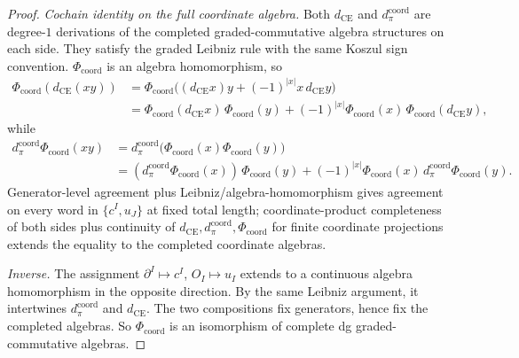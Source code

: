 \documentclass[11pt]{memoir}
\begin{document}
\begin{proof}
  \emph{Cochain identity on the full coordinate algebra.} Both
  \(d_{\mathrm{CE}}\) and \(d_\pi^{\mathrm{coord}}\) are degree-\(1\) derivations of the
  completed graded-commutative algebra structures on each side. They
	  satisfy the graded Leibniz rule with the same Koszul sign
	  convention. \(\Phi_{\mathrm{coord}}\) is an algebra homomorphism, so
	  \begin{align*}
	    \Phi_{\mathrm{coord}}(d_{\mathrm{CE}}(xy))
	    &=
	    \Phi_{\mathrm{coord}}\bigl((d_{\mathrm{CE}}x)y
	      +(-1)^{|x|}x\,d_{\mathrm{CE}}y\bigr)\\
	    &=
	    \Phi_{\mathrm{coord}}(d_{\mathrm{CE}}x)\,
	    \Phi_{\mathrm{coord}}(y)
	    +(-1)^{|x|}\Phi_{\mathrm{coord}}(x)\,
	    \Phi_{\mathrm{coord}}(d_{\mathrm{CE}}y),
	  \end{align*}
	  while
	  \begin{align*}
		    d_\pi^{\mathrm{coord}}\Phi_{\mathrm{coord}}(xy)
	    &=
		    d_\pi^{\mathrm{coord}}\bigl(\Phi_{\mathrm{coord}}(x)
	      \Phi_{\mathrm{coord}}(y)\bigr)\\
	    &=
		    (d_\pi^{\mathrm{coord}}\Phi_{\mathrm{coord}}(x))\,
	    \Phi_{\mathrm{coord}}(y)
	    +(-1)^{|x|}\Phi_{\mathrm{coord}}(x)\,
		    d_\pi^{\mathrm{coord}}\Phi_{\mathrm{coord}}(y).
	  \end{align*}
  Generator-level agreement plus Leibniz/algebra-homomorphism gives
  agreement on every word in $\{c^I,u_J\}$ at fixed total length;
  coordinate-product completeness of both sides plus continuity of
	  \(d_{\mathrm{CE}}, d_\pi^{\mathrm{coord}},\Phi_{\mathrm{coord}}\) for finite coordinate
  projections extends the equality to the completed coordinate algebras.

  \emph{Inverse.} The assignment $\partial^I\mapsto c^I$,
  $O_I\mapsto u_I$ extends to a continuous algebra homomorphism in the
  opposite direction. By the same Leibniz argument, it intertwines
	  \(d_\pi^{\mathrm{coord}}\) and \(d_{\mathrm{CE}}\). The two compositions fix generators,
	  hence fix the completed algebras. So \(\Phi_{\mathrm{coord}}\) is an isomorphism of
  complete dg graded-commutative algebras.


\end{proof}
\end{document}
